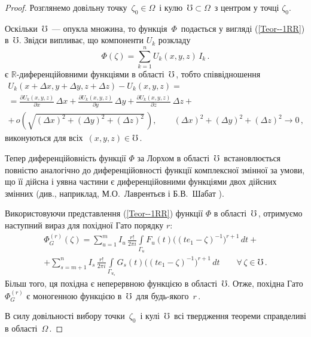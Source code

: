 \documentclass[11pt, reqno]{amsart}
\begin{document}
\begin{proof}
Розглянемо довільну точку\, $\zeta_0\in\Omega$\, і кулю\, $\mho\subset\Omega$\, з центром у точці $\zeta_0$.

Оскільки\, $\mho$\, --- опукла множина, то функція\, $\Phi$\, подається у вигляді (\ref{Teor--1RR}) в\, $\mho$.
Звідси випливає, що компоненти $U_k$ розкладу
\begin{equation}\label{3-1:rozklad-Phi-v-bazysi}
\Phi(\zeta)=\sum_{k=1}^n U_k(x,y,z)\,I_k\,.
 \end{equation}
 є $\mathbb{R}$-диференційовними функціями в області\, $\mho$\,, тобто співвідношення
\begin{multline*}
U_k(x+\Delta x,y+\Delta y,z+\Delta z)-U_k(x,y,z)=\\[2mm]
=\displaystyle \frac{\partial U_k(x,y,z)}{\partial x}\,\Delta x+
\frac{\partial U_k(x,y,z)}{\partial y}\,\Delta y+ \frac{\partial
U_k(x,y,z)}{\partial z}\,\Delta z+\\[2mm]
+\,o\left(\sqrt{(\Delta x)^2+(\Delta
y)^2+(\Delta z)^2}\,\right),\qquad (\Delta x)^2+(\Delta
y)^2+(\Delta z)^2\to 0\,,
\end{multline*}
виконуються для всіх\, $(x,y,z)\in\mho$\,.

Тепер диференційовність функції $\Phi$ за Лорхом в області\, $\mho$\, встановлюється
повністю аналогічно до диференційовності функції комплексної змінної за умови,
що її дійсна і уявна частини є диференційовними функціями двох дійсних змінних
(див., наприклад, М.О.~Лаврентьєв і Б.В.~Шабат \cite[с.~21]{L1}).


Використовуючи представлення (\ref{Teor--1RR}) функції $\Phi$ в області\, $\mho$\,,
отримуємо наступний вираз для похідної Гато порядку $r$:
\begin{multline*}
\Phi_G^{(r)}(\zeta)=\sum\limits_{u=1}^mI_u\,\frac{r!}{2\pi i}\int\limits_{\Gamma_u}
F_u(t)\Big((te_1-\zeta)^{-1}\Big)^{r+1}\,dt+\\
+\sum\limits_{s=m+1}^nI_s\,\frac{r!}{2\pi i}\int\limits_
{\Gamma_{u_s}}G_s(t)\Big((te_1-\zeta)^{-1}\Big)^{r+1}\,dt\qquad
\forall\,\zeta\in\mho\,.
\end{multline*}
Більш того, ця похідна є неперервною функцією в області\, $\mho$. Отже, похідна Гато
$\Phi_G^{(r)}$ є моногенною функцією в\, $\mho$\, для будь-якого\, $r$\,.

В силу довільності вибору точки\, $\zeta_0$\, і кулі\, $\mho$\, всі твердження теореми
справделиві в області\, $\Omega$\,.
\end{proof}
\end{document}
